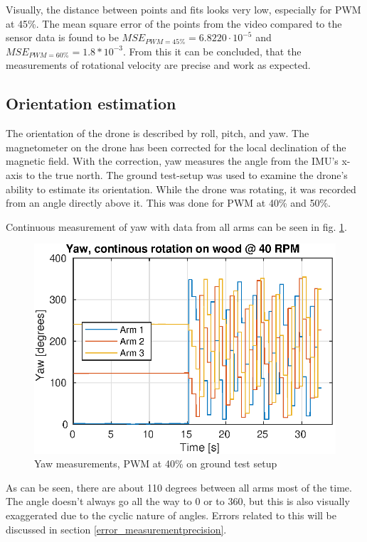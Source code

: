 Visually, the distance between points and fits looks very low, especially for PWM at 45\%. The mean square error of the points from the video compared to the sensor data is found to be $MSE_{PWM=45\%} = 6.8220\cdot 10^{-5}$ and $MSE_{PWM=60\%} = 1.8*10^{-3}$. From this it can be concluded, that the measurements of rotational velocity are precise and work as expected.






\subsection{Orientation estimation}
The orientation of the drone is described by roll, pitch, and yaw.  The magnetometer on the drone has been corrected for the local declination of the magnetic field. With the correction, yaw measures the angle from the IMU's x-axis to the true north. 
The ground test-setup was used to examine the drone's ability to estimate its orientation. 
While the drone was rotating, it was recorded from an angle directly above it. This was done for PWM at 40\% and 50\%. 

Continuous measurement of yaw with data from all arms can be seen in fig. \ref{fig:rpm40woodallarms}. 


\begin{figure}[h]
    \centering
    \includegraphics{figures/results/Yaw_rpm40_wood_allarms.eps}
    \caption{Yaw measurements, PWM at 40\% on ground test setup}
    \label{fig:rpm40woodallarms}
\end{figure}
As can be seen, there are about 110 degrees between all arms most of the time. 
The angle doesn't always go all the way to 0 or to 360, but this is also visually exaggerated due to the cyclic nature of angles. Errors related to this will be discussed in section \ref{error_measurementprecision}.


